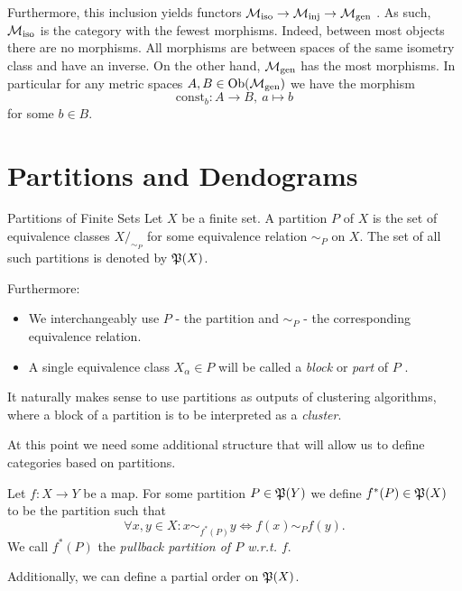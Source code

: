 Furthermore, this inclusion yields functors $\iso \to \inj \to \gen$ \cite[Def.~1.2.18]{Leinster2014-dc}.
As such, $\iso$ is the category with the fewest morphisms. Indeed, between most objects there are no morphisms.
All morphisms are between spaces of the same isometry class and have an inverse.
On the other hand, $\gen$ has the most morphisms. In particular for any metric spaces $A,B \in \ob(\gen)$ we have the morphism
$$
\mathrm{const}_b: A \to B, \ a \mapsto b
$$
for some $b \in B$.

\section{Partitions and Dendograms}
\label{section__partitions}

\begin{definition}{Partitions of Finite Sets}{}
Let $X$ be a finite set. A partition $P$ of $X$ is the set of equivalence classes $X/_{\sim_P}$ for some equivalence relation $\sim_P$ on $X$. The set of all such partitions is denoted by $\P(X)$.\par

\medskip Furthermore:
\begin{itemize}
    \item We interchangeably use $P$ - the partition and $\sim_P$ - the corresponding equivalence relation.
    \item A single equivalence class $X_\alpha \in P$ will be called a \emph{block} or \emph{part} of $P$ .
\end{itemize}
\end{definition}

It naturally makes sense to use partitions as outputs of clustering algorithms, where a block of a partition is to be interpreted as a \emph{cluster}.

At this point we need some additional structure that will allow us to define categories based on partitions.

\begin{definition}{}{}
Let $f: X \to Y$ be a map. For some partition $P \in \P(Y)$ we define $f^*(P) \in \P(X)$ to be the partition such that
\begin{equation*}
    \forall x,y \in X: x \sim_{f^*(P)} y \iff f(x) \sim_P f(y).
\end{equation*}
We call $f^*(P)$ the \emph{pullback partition of $P$ w.r.t. $f$}.
\end{definition}

Additionally, we can define a partial order on $\P(X)$.

